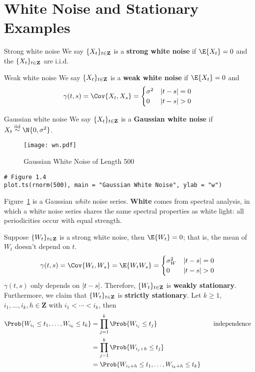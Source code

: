 \section{White Noise and Stationary Examples}
\begin{Definition}{Strong white noise}{}
    We say $ \{X_t\}_{t\in\mathbf{Z}} $ is a
    \textbf{strong white noise} if $ \E{X_t}=0 $
    and the $ \{X_t\}_{t\in\mathbf{Z}} $ are i.i.d.
\end{Definition}
\begin{Definition}{Weak white noise}{}
    We say $ \{X_t\}_{t\in\mathbf{Z}} $ is a
    \textbf{weak white noise} if $ \E{X_t}=0 $
    and
    \[ \gamma(t,s)=\Cov{X_t,X_s}=\begin{cases}
            \sigma^2 & \abs{t-s}=0 \\
            0        & \abs{t-s}>0
        \end{cases} \]
\end{Definition}
\begin{Definition}{Gaussian white noise}{}
    We say $ \{X_t\}_{t\in\mathbf{Z}} $ is a
    \textbf{Gaussian white noise}
    if $ X_t\stackrel{\text{iid}}{\sim}\N{0,\sigma^2} $.
\end{Definition}
\begin{figure}[!htbp]
    \centering
    \texttt{[image: wn.pdf]}
    \caption{Gaussian White Noise of Length 500}\label{fig:wn}
\end{figure}
\begin{verbatim}
# Figure 1.4
plot.ts(rnorm(500), main = "Gaussian White Noise", ylab = "w")
\end{verbatim}
Figure~\ref{fig:wn} is a Gaussian \emph{white} noise series.
\textbf{White} comes from spectral analysis,
in which a white noise series shares the same spectral properties as white light:
all periodicities occur with equal strength.
\begin{Example}{}{}
    Suppose $ \{W_t\}_{t\in\mathbf{Z}} $
    is a strong white noise, then $ \E{W_t}=0 $;
    that is, the mean of $ W_t $ doesn't depend on $ t $.
    \[ \gamma(t,s)=\Cov{W_t,W_s}=\E{W_t W_s}=
        \begin{cases}
            \sigma_W^2 & \abs{t-s}=0 \\
            0          & \abs{t-s}>0
        \end{cases} \]
    $ \gamma(t,s) $ only depends on $ \lvert t-s\rvert $. Therefore,
    $ \{W_t\}_{t\in\mathbf{Z}} $ is
    \textbf{weakly stationary}. Furthermore,
    we claim that
    $ \{W_t\}_{t\in\mathbf{Z}} $ is
    \textbf{strictly stationary}. Let $ k\ge 1 $,
    $ i_1,\ldots,i_k,h\in\mathbf{Z} $ with $ i_1<\cdots<i_k $, then
    \begin{align*}
        \Prob{W_{i_1}\le t_1,\ldots,W_{i_k}\le t_k}
         & =\prod_{j=1}^k\Prob{W_{i_j}\le t_j}                   & \quad & \text{independence} \\
         & =\prod_{j=1}^k\Prob{W_{{i_j}+h}\le t_j}                                             \\
         & =\Prob{W_{{i_1}+h}\le t_1,\ldots, W_{{i_k}+h}\le t_k}
    \end{align*}
\end{Example}
